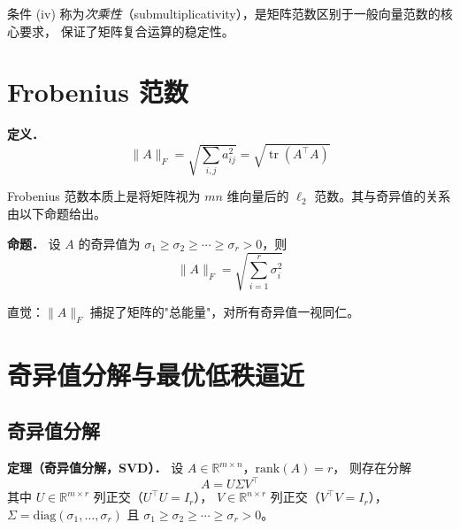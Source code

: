 \documentclass[12pt, a4paper]{article}
\newcommand{\tr}{\operatorname{tr}}
\begin{document}
条件 (iv) 称为\emph{次乘性}（submultiplicativity），是矩阵范数区别于一般向量范数的核心要求，
保证了矩阵复合运算的稳定性。

\section{Frobenius 范数}

\begin{defbox}
\textbf{定义．}
\[
  \|A\|_F = \sqrt{\sum_{i,j} a_{ij}^2} = \sqrt{\tr(A^\top A)}
\]
\end{defbox}

Frobenius 范数本质上是将矩阵视为 $mn$ 维向量后的 $\ell_2$ 范数。其与奇异值的关系由以下命题给出。

\begin{propbox}
\textbf{命题．} 设 $A$ 的奇异值为 $\sigma_1 \geq \sigma_2 \geq \cdots \geq \sigma_r > 0$，则
\[
  \|A\|_F = \sqrt{\sum_{i=1}^r \sigma_i^2}
\]
\end{propbox}

直觉：$\|A\|_F$ 捕捉了矩阵的"总能量"，对所有奇异值一视同仁。

\section{奇异值分解与最优低秩逼近}

\subsection{奇异值分解}

\begin{defbox}
\textbf{定理（奇异值分解，SVD）．} 设 $A \in \mathbb{R}^{m \times n}$，$\mathrm{rank}(A) = r$，
则存在分解
\[
  A = U \Sigma V^\top
\]
其中 $U \in \mathbb{R}^{m \times r}$ 列正交（$U^\top U = I_r$），
$V \in \mathbb{R}^{n \times r}$ 列正交（$V^\top V = I_r$），
$\Sigma = \mathrm{diag}(\sigma_1, \ldots, \sigma_r)$ 且
$\sigma_1 \geq \sigma_2 \geq \cdots \geq \sigma_r > 0$。
\end{defbox}
\end{document}
